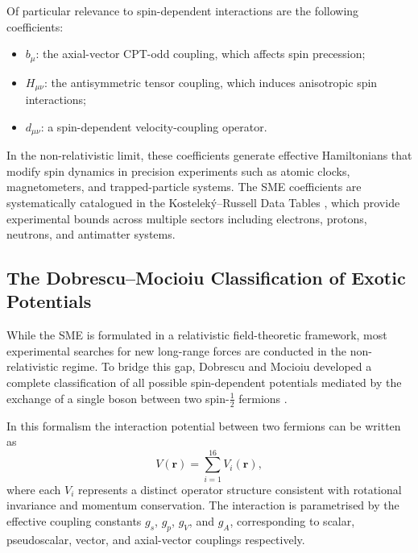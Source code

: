 \documentclass[12pt,a4paper]{report}
\begin{document}
Of particular relevance to spin-dependent interactions are the following
coefficients:
\begin{itemize}
  \item $b_{\mu}$: the axial-vector CPT-odd coupling, which affects spin
    precession;
  \item $H_{\mu\nu}$: the antisymmetric tensor coupling, which induces
    anisotropic spin interactions;
  \item $d_{\mu\nu}$: a spin-dependent velocity-coupling operator.
\end{itemize}
In the non-relativistic limit, these coefficients generate effective
Hamiltonians that modify spin dynamics in precision experiments such as atomic
clocks, magnetometers, and trapped-particle systems. The SME coefficients are
systematically catalogued in the Kostelek\'{y}--Russell Data Tables
\cite{Kostelecky2011}, which provide experimental bounds across multiple sectors
including electrons, protons, neutrons, and antimatter systems.

\subsection{The Dobrescu--Mocioiu Classification of Exotic Potentials}

While the SME is formulated in a relativistic field-theoretic framework, most
experimental searches for new long-range forces are conducted in the
non-relativistic regime. To bridge this gap, Dobrescu and Mocioiu developed a
complete classification of all possible spin-dependent potentials mediated by
the exchange of a single boson between two spin-$\frac{1}{2}$ fermions
\cite{Dobrescu2006}.

In this formalism the interaction potential between two fermions can be written
as
\begin{equation}
  V(\mathbf{r}) = \sum_{i=1}^{16} V_{i}(\mathbf{r}),
\end{equation}
where each $V_{i}$ represents a distinct operator structure consistent with
rotational invariance and momentum conservation. The interaction is
parametrised by the effective coupling constants $g_{s}$, $g_{p}$, $g_{V}$,
and $g_{A}$, corresponding to scalar, pseudoscalar, vector, and axial-vector
couplings respectively.
\end{document}
